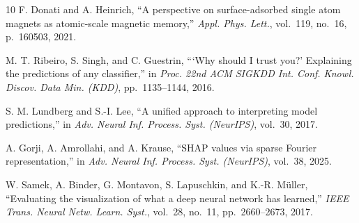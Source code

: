\documentclass[final,5p,times,twocolumn]{elsarticle}
\begin{document}
\begin{thebibliography}{10}
F. Donati and A. Heinrich, ``A perspective on surface-adsorbed single atom magnets as atomic-scale magnetic memory,'' {\em Appl. Phys. Lett.}, vol.~119, no.~16, p.~160503, 2021.

M. T. Ribeiro, S. Singh, and C. Guestrin, ```Why should {I} trust you?' Explaining the predictions of any classifier,'' in {\em Proc. 22nd ACM SIGKDD Int. Conf. Knowl. Discov. Data Min. (KDD)}, pp.~1135--1144, 2016.

S. M. Lundberg and S.-I. Lee, ``A unified approach to interpreting model predictions,'' in {\em Adv. Neural Inf. Process. Syst. (NeurIPS)}, vol.~30, 2017.

A. Gorji, A. Amrollahi, and A. Krause, ``{SHAP} values via sparse {F}ourier representation,'' in {\em Adv. Neural Inf. Process. Syst. (NeurIPS)}, vol.~38, 2025.

W. Samek, A. Binder, G. Montavon, S. Lapuschkin, and K.-R. M\"uller, ``Evaluating the visualization of what a deep neural network has learned,'' {\em IEEE Trans. Neural Netw. Learn. Syst.}, vol.~28, no.~11, pp.~2660--2673, 2017.

\end{thebibliography}
\end{document}
